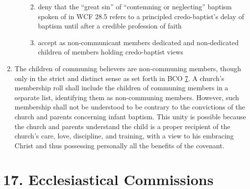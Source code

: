 \documentclass[
]{book}
\providecommand{\tightlist}{%
  \setlength{\itemsep}{0pt}\setlength{\parskip}{0pt}}
\begin{document}
\begin{enumerate}
\begin{enumerate}
    \begin{enumerate}
    \def\labelenumiii{\arabic{enumiii}.}
    \tightlist
    \item
      deny that the ``great sin'' of ``contemning or neglecting'' baptism spoken of in WCF 28.5 refers to a principled credo-baptist's delay of baptism until after a credible profession of faith
    \item
      accept as non-communicant members dedicated and non-dedicated children of members holding credo-baptist views
    \end{enumerate}
  \end{enumerate}
\item
  The children of communing believers are non-communing members, though only in the strict and distinct sense as set forth in BCO \protect\hyperlink{7}{7}. A church's membership roll shall include the children of communing members in a separate list, identifying them as non-communing members. However, such membership shall not be understood to be contrary to the convictions of the church and parents concerning infant baptism. This unity is possible because the church and parents understand the child is a proper recipient of the church's care, love, discipline, and training, with a view to his embracing Christ and thus possessing personally all the benefits of the covenant.
\end{enumerate}

\hypertarget{ecclesiastical-commissions}{%
\section*{17. Ecclesiastical Commissions}\label{ecclesiastical-commissions}}

\protect\hypertarget{chapter-slug-17-ecclesiastical-commissions}{\href{}{}}
\end{document}
